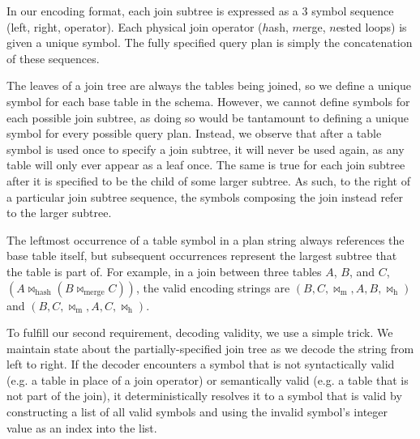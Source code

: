 In our encoding format, each join subtree is expressed as a 3 symbol sequence (left, right, operator). Each physical join operator ($h$ash, $m$erge, $n$ested loops) is given a unique symbol. The fully specified query plan is simply the concatenation of these sequences.

The leaves of a join tree are always the tables being joined, so we define a unique symbol for each base table in the schema. However, we cannot define symbols for each possible join subtree, as doing so would be tantamount to defining a unique symbol for every possible query plan. Instead, we observe that after a table symbol is used once to specify a join subtree, it will never be used again, as any table will only ever appear as a leaf once. The same is true for each join subtree after it is specified to be the child of some larger subtree. As such, to the right of a particular join subtree sequence, the symbols composing the join instead refer to the larger subtree.


The leftmost occurrence of a table symbol in a plan string always references the base table itself, but subsequent occurrences represent the largest subtree that the table is part of. For example, in a join between three tables $A$, $B$, and $C$, $(A \bowtie_\text{hash} (B \bowtie_\text{merge} C))$, the valid encoding strings are $(B, C, \bowtie_\text{m}, A, B, \bowtie_\text{h})$ and $(B, C, \bowtie_\text{m}, A, C, \bowtie_\text{h})$.

To fulfill our second requirement, decoding validity, we use a simple trick. We maintain state about the partially-specified join tree as we decode the string from left to right. If the decoder encounters a symbol that is not syntactically valid (e.g. a table in place of a join operator) or semantically valid (e.g. a table that is not part of the join), it deterministically resolves it to a symbol that is valid by constructing a list of all valid symbols and using the invalid symbol's integer value as an index into the list.


